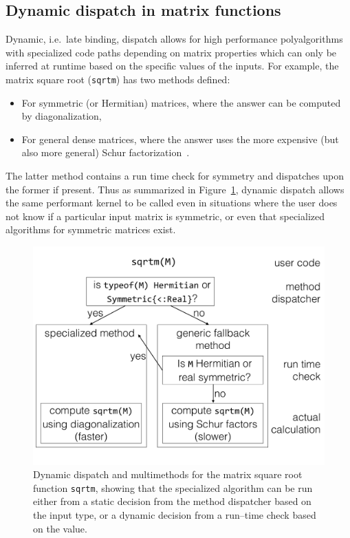 \documentclass[pldi]{sigplanconf-pldi15}
\begin{document}
\subsection{Dynamic dispatch in matrix functions}

Dynamic, i.e.\ late binding, dispatch allows for high performance
polyalgorithms with specialized code paths depending on matrix properties which
can only be inferred at runtime based on the specific values of the inputs. For
example, the matrix square root (\verb|sqrtm|) has two methods defined:

\begin{itemize}
	\item For symmetric (or Hermitian) matrices, where the answer can be
		computed by diagonalization,
	\item For general dense matrices, where the answer uses the more
		expensive (but also more general) Schur
		factorization~\cite{Higham2008}.
\end{itemize}
%
The latter method contains a run time check for symmetry and dispatches upon
the former if present. Thus as summarized in Figure~\ref{fig:sqrtm}, dynamic
dispatch allows the same performant kernel to be called even in situations
where the user does not know if a particular input matrix is symmetric, or even
that specialized algorithms for symmetric matrices exist.

\begin{figure}
	\centering
	\includegraphics[width=\columnwidth]{fig-sqrtm}
	\caption{Dynamic dispatch and multimethods for the matrix square root
		function \texttt{sqrtm}, showing that the specialized algorithm
		can be run either from a static decision from the method
		dispatcher based on the input type, or a dynamic decision from
		a run--time check based on the value.}
	\label{fig:sqrtm}
\end{figure}
\end{document}
